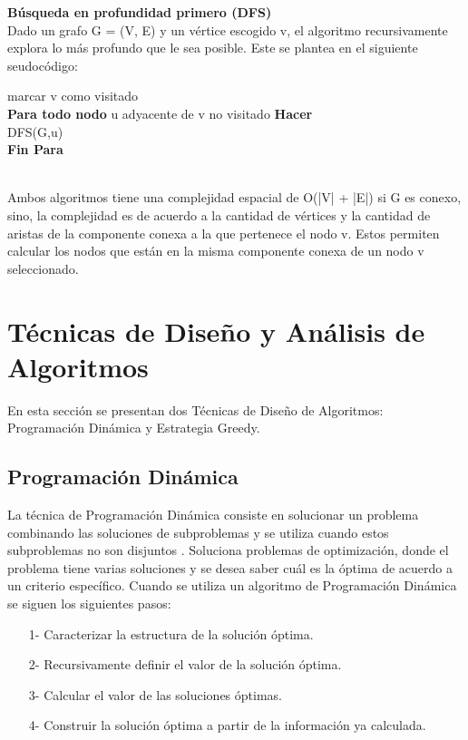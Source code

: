 \documentclass{report}
\begin{document}
{\bf B\'usqueda en profundidad primero (DFS)}\\
Dado un grafo G = (V, E) y un v\'ertice escogido v, el algoritmo recursivamente explora lo
m\'as profundo que le sea posible\cite{Cormen}. Este se plantea en el siguiente seudoc\'odigo:\\

\begin{algorithm}[H] %
	\caption{DFS(G,v)}\label{ML:Algorithm2}
	\SetAlgoLined
	\LinesNumbered
	\SetAlgoVlined
	marcar v como visitado\\
    {\bf Para todo nodo} u adyacente de v no visitado {\bf Hacer}\\
	\hspace{1cm}DFS(G,u)\\
   {\bf Fin Para}\\
	
\end{algorithm}
\hspace{1cm}\\


Ambos algoritmos tiene una complejidad espacial de O(|V| + |E|) si G es conexo, sino, la
complejidad es de acuerdo a la cantidad de v\'ertices y la cantidad de aristas de la componente
conexa a la que pertenece el nodo v. Estos permiten calcular los nodos que est\'an en la misma
componente conexa de un nodo v seleccionado.

\section{T\'ecnicas de Dise\~no y An\'alisis de Algoritmos}
En esta secci\'on se presentan dos T\'ecnicas de Dise\~no de Algoritmos: Programaci\'on Din\'amica
y Estrategia Greedy.

\subsection{Programaci\'on Din\'amica}
La t\'ecnica de Programaci\'on Din\'amica consiste en solucionar un problema combinando las
soluciones de subproblemas y se utiliza cuando estos subproblemas no son disjuntos \cite{Cormen}\cite{Halim}\cite{DP1}. Soluciona
problemas de optimizaci\'on, donde el problema tiene varias soluciones y se desea saber cu\'al es
la \'optima de acuerdo a un criterio espec\'ifico. Cuando se utiliza un algoritmo de Programaci\'on
Din\'amica se siguen los siguientes pasos:
\begin{enumerate}
\item[1-] Caracterizar la estructura de la soluci\'on \'optima.
\item[2-] Recursivamente definir el valor de la soluci\'on \'optima.
\item[3-] Calcular el valor de las soluciones \'optimas.
\item[4-] Construir la soluci\'on \'optima a partir de la informaci\'on ya calculada.
\end{enumerate}
\end{document}

